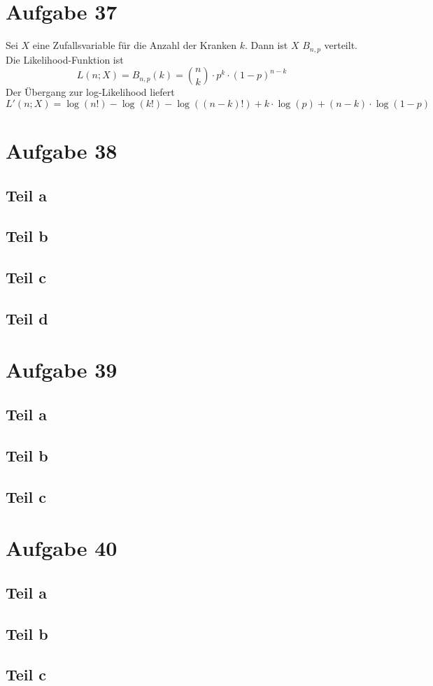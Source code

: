\documentclass[10pt,a4paper]{article}
\begin{document}
\section{Aufgabe 37}

Sei $X$ eine Zufallsvariable für die Anzahl der Kranken $k$.
Dann ist $X$ $B_{n,p}$ verteilt.
Die Likelihood-Funktion ist
\begin{equation}
  L(n; X) = B_{n, p}(k) = \binom{n}{k} \cdot p^{k} \cdot (1 - p)^{n - k}
\end{equation}
Der Übergang zur log-Likelihood liefert
\begin{equation}
  L'(n; X) = \log(n!) - \log(k!) - \log((n - k)!) + k \cdot \log(p) + (n - k) \cdot \log(1 - p)
\end{equation}

\section{Aufgabe 38}

\subsection{Teil a}

\subsection{Teil b}

\subsection{Teil c}

\subsection{Teil d}

\section{Aufgabe 39}

\subsection{Teil a}

\subsection{Teil b}

\subsection{Teil c}

\section{Aufgabe 40}

\subsection{Teil a}

\subsection{Teil b}

\subsection{Teil c}
\end{document}
